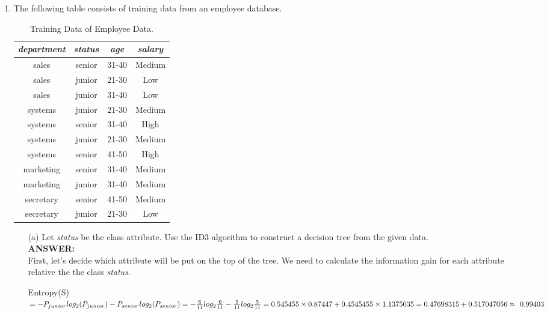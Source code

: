\documentclass{article}
\begin{document}
\begin{enumerate}
\item The following table consists of training data from an employee
  database.
\begin{table}[H]
  \begin{center}
    \begin{tabular}{|c|c|c|c|}
      \hline {\it department} & {\it status}&{\it age}&{\it salary} \\
      \hline 
      sales & senior & 31-40 & Medium \\
      sales & junior & 21-30 & Low \\
      sales & junior & 31-40 & Low \\
      systems & junior & 21-30 & Medium \\
      systems & senior & 31-40 & High \\
      systems & junior & 21-30 & Medium \\
      systems & senior & 41-50 & High \\
      marketing & senior & 31-40 & Medium \\
      marketing & junior & 31-40 & Medium \\
      secretary & senior & 41-50 & Medium \\
      secretary & junior & 21-30 & Low \\
      \hline
    \end{tabular}
    \caption{Training Data of Employee Data.\label{tbl:dat_eple}}
  \end{center}
  \vspace{-10pt}
\end{table}

\begin{enumerate}
\item[(a)] Let {\it status} be the class attribute. Use the ID3
  algorithm to construct a decision tree from the given data.\\
\textbf{ANSWER:} \\
First, let's decide which attribute will be put on the top of the
tree. We need to calculate the information gain for each attribute
relative the the class {\it status}.

Entropy(S)$ = -P_{junior}log_2(P_{junior})-P_{senior}log_2(P_{senior}) \\
= -\frac{6}{11}log_2\frac{6}{11}-\frac{5}{11}log_2\frac{5}{11} \\
= 0.545455\times 0.87447 + 0.4545455 \times 1.1375035  \\
= 0.47698315 + 0.517047056 \\
\approx~ 0.99403$ \\


\end{enumerate}
\end{enumerate}
\end{document}
